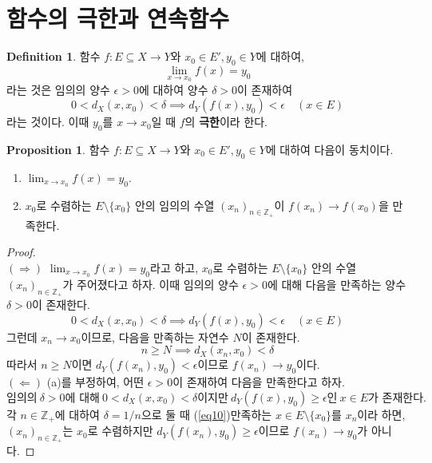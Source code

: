 \documentclass[11pt]{book}
\numberwithin{equation}{chapter}
\def\ZZ{\mathbb{Z}}
\def\eps{\epsilon}
\theoremstyle{definition}
\newtheorem{prop}[thm]{Proposition}
\newtheorem{defn}[thm]{Definition}
\newenvironment{enum}
	{\begin{enumerate}[label=(\alph*), leftmargin=2\parindent]}
	{\end{enumerate}}
\begin{document}
\section{함수의 극한과 연속함수}

\begin{defn}
    함수 \(f : E \subseteq X \to Y\)와 \(x_0 \in E', y_0 \in Y\)에 대하여,
    \[
    \lim_{x \to x_0} f(x) = y_0
    \]
    라는 것은 임의의 양수 \(\eps > 0\)에 대하여 양수 \(\delta > 0\)이 존재하여
    \[
    0 < d_X(x, x_0) < \delta \implies d_Y(f(x), y_0) < \eps \quad (x \in E)    
    \]
    라는 것이다. 이때 \(y_0\)를 \(x \to x_0\)일 때 \(f\)의 \textbf{극한}이라 한다.
\end{defn}

\begin{prop}
    함수 \(f : E \subseteq X \to Y\)와 \(x_0 \in E', y_0 \in Y\)에 대하여 다음이 동치이다.
    \begin{enum}
        \item \(\lim_{x \to x_0} f(x) = y_0\).
        \item \(x_0\)로 수렴하는 \(E \setminus \{x_0\}\) 안의 임의의 수열 \((x_n)_{n \in \ZZ_+}\)이 \(f(x_n) \to f(x_0)\)을 만족한다.
    \end{enum}
\end{prop}
\begin{proof}
    \quad\\
    \((\Rightarrow)\) \(\lim_{x \to x_0} f(x) = y_0\)라고 하고, \(x_0\)로 수렴하는 \(E \setminus \{x_0\}\) 안의 수열 \((x_n)_{n \in \ZZ_+}\)가 주어졌다고 하자. 이때 임의의 양수 \(\eps > 0\)에 대해 다음을 만족하는 양수 \(\delta > 0\)이 존재한다.
    \[
        0 < d_X(x, x_0) < \delta \implies d_Y(f(x), y_0) < \eps \quad (x \in E)
    \]
    그런데 \(x_n \to x_0\)이므로, 다음을 만족하는 자연수 \(N\)이 존재한다.
    \[
    n \ge N \implies d_X(x_n, x_0) < \delta    
    \]
    따라서 \(n \ge N\)이면 \(d_Y(f(x_n), y_0) < \eps\)이므로 \(f(x_n) \to y_0\)이다.\\
    \((\Leftarrow)\) (a)를 부정하여, 어떤 \(\eps > 0\)이 존재하여 다음을 만족한다고 하자. 
    \begin{equation} \label{eq10}
        \text{임의의} \ \delta > 0\text{에 대해} \ 0 < d_X(x, x_0) < \delta\text{이지만} \ d_Y(f(x), y_0) \ge \eps\text{인} \ x \in E\text{가 존재한다.}
    \end{equation}
    각 \(n \in \ZZ_+\)에 대하여 \(\delta = 1/n\)으로 둘 때 (\ref{eq10})\을 만족하는 \(x \in E \setminus \{x_0\}\)를 \(x_n\)이라 하면, \((x_n)_{n \in \ZZ_+}\)는 \(x_0\)로 수렴하지만 \(d_Y(f(x_n), y_0) \ge \eps\)이므로 \(f(x_n) \to y_0\)가 아니다.
\end{proof}
\end{document}
